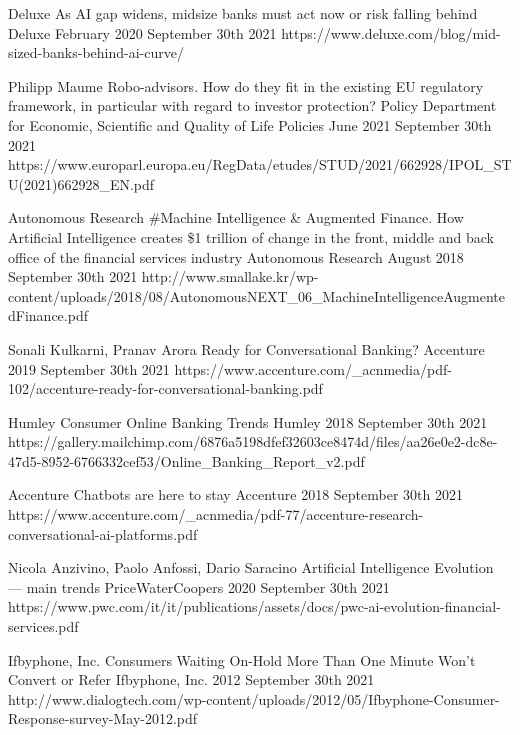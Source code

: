 \begin{thebibliography}{100}
{Deluxe}
{As AI gap widens, midsize banks must act now or risk falling behind}
{Deluxe}
{February 2020}
{September 30th 2021}
{https://www.deluxe.com/blog/mid-sized-banks-behind-ai-curve/}

{Philipp Maume}
{Robo-advisors. How do they fit in the existing EU regulatory framework, in particular with regard to investor protection?}
{Policy Department for Economic, Scientific and Quality of Life Policies}
{June 2021}
{September 30th 2021}
{https://www.europarl.europa.eu/RegData/etudes/STUD/2021/662928/IPOL\_STU(2021)662928\_EN.pdf}

{Autonomous Research}
{\#Machine Intelligence \& Augmented Finance. How Artificial Intelligence creates \$1 trillion of change in the front, middle and back office of the financial services industry}
{Autonomous Research}
{August 2018}
{September 30th 2021}
{http://www.smallake.kr/wp-content/uploads/2018/08/AutonomousNEXT\_06\_MachineIntelligenceAugmentedFinance.pdf}

{Sonali Kulkarni, Pranav Arora}
{Ready for Conversational Banking?}
{Accenture}
{2019}
{September 30th 2021}
{https://www.accenture.com/\_acnmedia/pdf-102/accenture-ready-for-conversational-banking.pdf}

{Humley}
{Consumer Online Banking Trends}
{Humley}
{2018}
{September 30th 2021}
{https://gallery.mailchimp.com/6876a5198dfef32603ce8474d/files/aa26e0e2-dc8e-47d5-8952-6766332cef53/Online\_Banking\_Report\_v2.pdf}

{Accenture}
{Chatbots are here to stay}
{Accenture}
{2018}
{September 30th 2021}
{https://www.accenture.com/\_acnmedia/pdf-77/accenture-research-conversational-ai-platforms.pdf}

{Nicola Anzivino, Paolo Anfossi, Dario Saracino}
{Artificial Intelligence Evolution — main trends}
{PriceWaterCoopers}
{2020}
{September 30th 2021}
{https://www.pwc.com/it/it/publications/assets/docs/pwc-ai-evolution-financial-services.pdf}

{Ifbyphone, Inc.}
{Consumers Waiting On-Hold More Than One Minute Won’t Convert or Refer}
{Ifbyphone, Inc.}
{2012}
{September 30th 2021}
{http://www.dialogtech.com/wp-content/uploads/2012/05/Ifbyphone-Consumer-Response-survey-May-2012.pdf}


\end{thebibliography}
